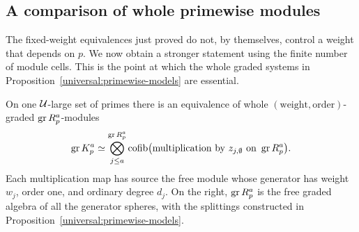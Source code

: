 \subsection{A comparison of whole primewise modules}

The fixed-weight equivalences just proved do not, by themselves,
control a weight that depends on $p$. We now obtain a stronger
statement using the finite number of module cells. This is the
point at which the whole graded systems in
Proposition~\ref{universal:primewise-models} are essential.

\begin{proposition}\label{universal:whole-module}
On one $\mathcal U$-large set of primes there is an equivalence of whole
$(\text{weight},\text{order})$-graded $\operatorname{gr} R_p^a$-modules
\begin{equation}\label{eq:whole-module}
 \operatorname{gr} K_p^a\simeq
 \bigotimes_{j\leq a}^{\operatorname{gr} R_p^a}
 \operatorname{cofib}\bigl(\text{multiplication by }z_{j,\emptyset}
                         \text{ on }\operatorname{gr} R_p^a\bigr).
\end{equation}
Each multiplication map has source the free module whose
generator has weight $w_j$, order one, and ordinary degree
$d_j$. On the right, $\operatorname{gr} R_p^a$ is the free graded algebra
of all the generator spheres, with the splittings constructed
in Proposition~\ref{universal:primewise-models}.
\end{proposition}

